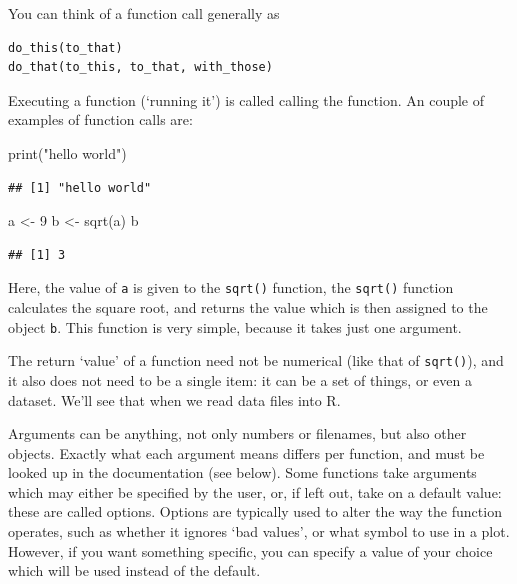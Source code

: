 \documentclass[
]{book}
\newenvironment{Shaded}{\begin{snugshade}}{\end{snugshade}}
\newcommand{\DecValTok}[1]{\textcolor[rgb]{0.00,0.00,0.81}{#1}}
\newcommand{\FunctionTok}[1]{\textcolor[rgb]{0.00,0.00,0.00}{#1}}
\newcommand{\NormalTok}[1]{#1}
\newcommand{\OtherTok}[1]{\textcolor[rgb]{0.56,0.35,0.01}{#1}}
\newcommand{\StringTok}[1]{\textcolor[rgb]{0.31,0.60,0.02}{#1}}
\begin{document}
You can think of a function call generally as

\begin{verbatim}
do_this(to_that)
do_that(to_this, to_that, with_those)
\end{verbatim}

Executing a function (`running it') is called calling the function. An couple of examples of function calls are:

\begin{Shaded}
\begin{Highlighting}[]
\FunctionTok{print}\NormalTok{(}\StringTok{"hello world"}\NormalTok{)}
\end{Highlighting}
\end{Shaded}

\begin{verbatim}
## [1] "hello world"
\end{verbatim}

\begin{Shaded}
\begin{Highlighting}[]
\NormalTok{a }\OtherTok{\textless{}{-}} \DecValTok{9}
\NormalTok{b }\OtherTok{\textless{}{-}} \FunctionTok{sqrt}\NormalTok{(a)}
\NormalTok{b}
\end{Highlighting}
\end{Shaded}

\begin{verbatim}
## [1] 3
\end{verbatim}

Here, the value of \texttt{a} is given to the \texttt{sqrt()} function, the \texttt{sqrt()} function calculates the square root, and returns the value which is then assigned to the object \texttt{b}. This function is very simple, because it takes just one argument.

The return `value' of a function need not be numerical (like that of \texttt{sqrt()}), and it also does not need to be a single item: it can be a set of things, or even a dataset. We'll see that when we read data files into R.

Arguments can be anything, not only numbers or filenames, but also other objects. Exactly what each argument means differs per function, and must be looked up in the documentation (see below). Some functions take arguments which may either be specified by the user, or, if left out, take on a default value: these are called options. Options are typically used to alter the way the function operates, such as whether it ignores `bad values', or what symbol to use in a plot. However, if you want something specific, you can specify a value of your choice which will be used instead of the default.
\end{document}
